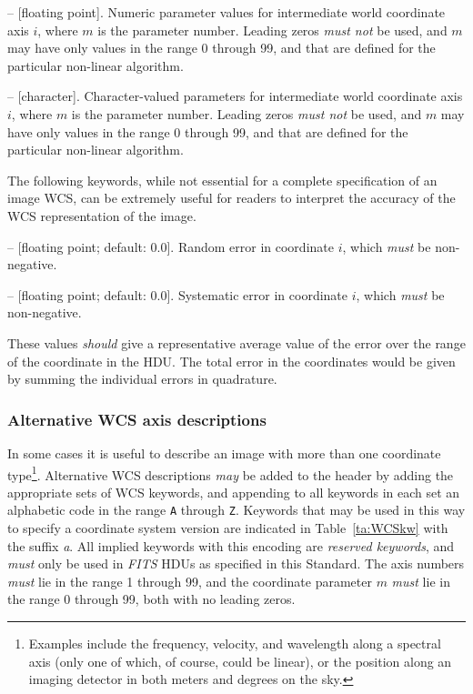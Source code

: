 \documentclass[onecolumn]{aa}
\begin{document}
\begin{description}

\item {}  -- [floating point]. 
Numeric parameter values for
intermediate world coordinate axis $i$, where $m$ is the parameter number. Leading
zeros {\em must not} be used, and $m$ may have only values in the range 0 through 99,
and that are defined for the particular non-linear algorithm. 

\item {}  -- [character]. 
Character-valued parameters for
intermediate world coordinate axis $i$, where $m$ is the parameter number. Leading
zeros {\em must not} be used, and $m$ may have only values in the range 0 through 99,
and that are defined for the particular non-linear algorithm. 

\end{description}

The following keywords, while not essential for a complete specification of an
image WCS, can be extremely useful for readers to interpret the accuracy of the
WCS representation of the image. 

\begin{description}

\item {}  -- [floating point; default: 0.0]. 
Random error in coordinate $i$, which {\em must} be non-negative. 

\item {}  -- [floating point; default: 0.0]. 
Systematic error in coordinate $i$, which {\em must} be non-negative. 

\end{description}

\noindent These values {\em should} give a representative average value of the
error over the range of the coordinate in the HDU. The total error in the
coordinates would be given by summing the individual errors in quadrature. 

\subsubsection{Alternative WCS axis descriptions}

In some cases it is useful to describe an image with more than one coordinate 
type\footnote{Examples include the frequency, velocity, and wavelength along a
spectral axis (only one of which, of course, could be linear), or the position
along an imaging detector in both meters and degrees on the sky.}.  Alternative WCS
descriptions {\em may} be added to the header by adding the appropriate sets of
WCS keywords, and appending to all keywords in each set an alphabetic code in the
range {\tt A} through {\tt Z}. Keywords that may be used in this way to specify a
coordinate system version are indicated in Table~\ref{ta:WCSkw} with the suffix \textit{a}.
All implied keywords with this encoding are {\em reserved keywords}, and
{\em must} only be used in {\em FITS\/} HDUs as specified in this Standard. The axis
numbers {\em must} lie in the range 1 through 99, and the coordinate parameter $m$
{\em must} lie in the range 0 through 99, both with no leading zeros. 
\end{document}
